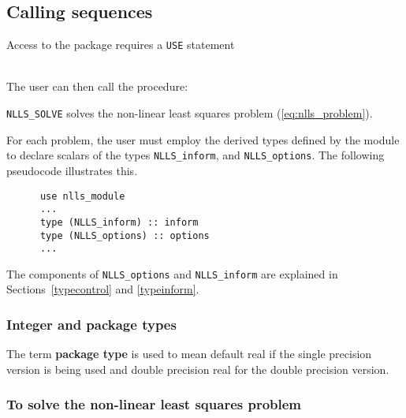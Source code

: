 \documentclass{spec}
\begin{document}
\newpage
\hslhowto

\subsection{Calling sequences}

Access to the package requires a {\tt USE} statement \\ \\
\indent\hspace{5mm}{\tt use ral\_nlls\_double} 
\medskip

\noindent The user can then call the procedure:
\vspace{-0.1cm}
\begin{description}
\item {\tt NLLS\_SOLVE}  solves the non-linear least squares problem (\ref{eq:nlls_problem}).
\end{description}


\hsltypes
\label{derived types}
For each problem, the user must employ the derived types defined by the
module to declare scalars of the types {\tt NLLS\_inform}, and
{\tt NLLS\_options}.
The following pseudocode illustrates this.
\begin{verbatim}
      use nlls_module
      ...
      type (NLLS_inform) :: inform
      type (NLLS_options) :: options
      ...
\end{verbatim}
The components of {\tt NLLS\_options} and {\tt NLLS\_inform} are explained
in Sections~\ref{typecontrol} and \ref{typeinform}. 


\hslarguments

\subsubsection{Integer and package types}
The term {\bf package type} is used to mean
default real if the single precision version is being used and
double precision real for the double precision version.

\subsubsection{To solve the non-linear least squares problem}
\label{sec:solve}
\end{document}
